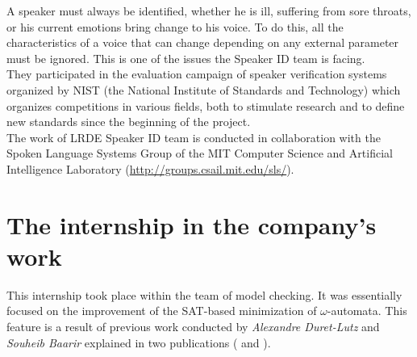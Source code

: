 A speaker must always be identified, whether he is ill, suffering from sore throats, or his
current emotions bring change to his voice. To do this, all the characteristics of a voice that can change
depending on any external parameter must be ignored. This is one of the issues the Speaker ID team is
facing.\\

They participated in the evaluation campaign of speaker verification systems organized by NIST
(the National Institute of Standards and Technology) which organizes competitions in various fields, both
to stimulate research and to define new standards since the beginning of the project.\\

The work of LRDE Speaker ID team is conducted in collaboration with the Spoken Language Systems Group of
the MIT Computer Science and Artificial Intelligence Laboratory (\url{http://groups.csail.mit.edu/sls/}).


\section{The internship in the company's work}
This internship took place within the team of model checking. It was essentially focused on
the improvement of the SAT-based minimization of $\omega$-automata. This feature is a result of
previous work conducted by \textit{Alexandre Duret-Lutz} and \textit{Souheib Baarir} explained in two
publications (\cite{14} and \cite{15}).